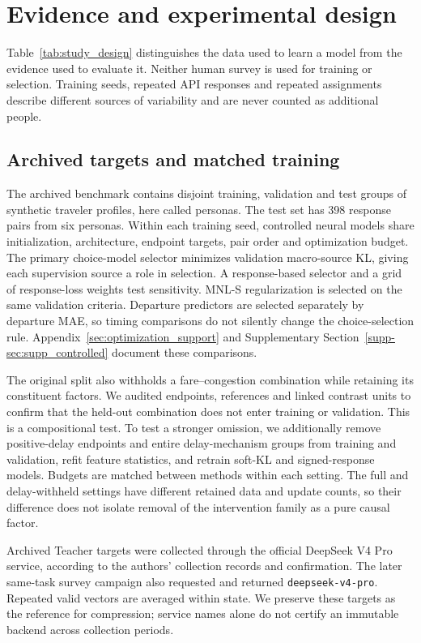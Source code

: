 \section{Evidence and experimental design}
\label{sec:design}
Table~\ref{tab:study_design} distinguishes the data used to learn a model from the evidence used to evaluate it. Neither human survey is used for training or selection. Training seeds, repeated API responses and repeated assignments describe different sources of variability and are never counted as additional people.


\subsection{Archived targets and matched training}
\label{sec:controlled_design}
The archived benchmark contains disjoint training, validation and test groups of synthetic traveler profiles, here called personas. The test set has 398 response pairs from six personas. Within each training seed, controlled neural models share initialization, architecture, endpoint targets, pair order and optimization budget. The primary choice-model selector minimizes validation macro-source KL, giving each supervision source a role in selection. A response-based selector and a grid of response-loss weights test sensitivity. MNL-S regularization is selected on the same validation criteria. Departure predictors are selected separately by departure MAE, so timing comparisons do not silently change the choice-selection rule. Appendix~\ref{sec:optimization_support} and Supplementary Section~\ref{supp-sec:supp_controlled} document these comparisons.

The original split also withholds a fare--congestion combination while retaining its constituent factors. We audited endpoints, references and linked contrast units to confirm that the held-out combination does not enter training or validation. This is a compositional test. To test a stronger omission, we additionally remove positive-delay endpoints and entire delay-mechanism groups from training and validation, refit feature statistics, and retrain soft-KL and signed-response models. Budgets are matched between methods within each setting. The full and delay-withheld settings have different retained data and update counts, so their difference does not isolate removal of the intervention family as a pure causal factor.

Archived Teacher targets were collected through the official DeepSeek V4 Pro service, according to the authors' collection records and confirmation. The later same-task survey campaign also requested and returned \texttt{deepseek-v4-pro}. Repeated valid vectors are averaged within state. We preserve these targets as the reference for compression; service names alone do not certify an immutable backend across collection periods.

